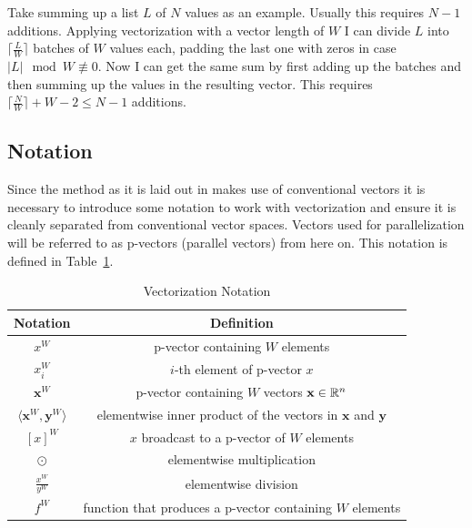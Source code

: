 \documentclass[a4paper, 11pt]{memoir}
\begin{document}
    Take summing up a list $L$ of $N$ values as an example. Usually this requires $N - 1$ additions.
    Applying vectorization with a vector length of $W$ I can divide $L$ into $\lceil \frac{L}{W} \rceil$
    batches of $W$ values each, padding the last one with zeros in case $|L| \mod W \not\equiv 0$. Now I
    can get the same sum by first adding up the batches and then summing up the values in the resulting
    vector. This requires $\lceil \frac{N}{W} \rceil + W - 2 \leq N - 1$ additions.

    \subsection{Notation}
    \label{sec:notation}
    Since the method as it is laid out in \cite{Rhodin:2015} makes use of conventional vectors it is
    necessary to introduce some notation to work with vectorization and ensure it is
    cleanly separated from conventional vector spaces. Vectors used for parallelization
    will be referred to as p-vectors (parallel vectors) from here on. This notation is
    defined in Table~\ref{tab:notation}.
    \begin{table}[b]
        \centering
        \begin{tabular}{|c|c|}
            \hline
            Notation & Definition \\
            \hline
            $x^W$ & p-vector containing $W$ elements\\
            $x^W_i$ & $i$-th element of p-vector $x$\\
            $\mathbf{x}^W$ & p-vector containing $W$ vectors $\mathbf{x} \in \mathbb{R}^n$\\
            $\langle \mathbf{x}^W, \mathbf{y}^W \rangle$ & elementwise inner product of the vectors in $\mathbf{x}$ and $\mathbf{y}$\\
            $[ x ]^W$ & $x$ broadcast to a p-vector of $W$ elements\\
            $\odot$ & elementwise multiplication\\
            $\frac{x^W}{y^W}$ & elementwise division\\
            $f^W$ & function that produces a p-vector containing $W$ elements\\\hline
        \end{tabular}
        \caption{Vectorization Notation}
        \label{tab:notation}
    \end{table}
\end{document}
